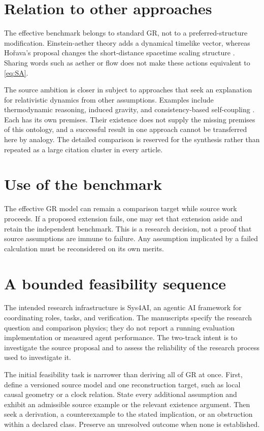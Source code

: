 \documentclass[11pt]{article}
\begin{document}
\section{Relation to other approaches}
The effective benchmark belongs to standard GR, not to a preferred-structure modification. Einstein-aether theory adds a dynamical timelike vector, whereas Ho\v{r}ava's proposal changes the short-distance spacetime scaling structure \parencite{JacobsonMattingly2001,Horava2009}. Sharing words such as aether or flow does not make these actions equivalent to \eqref{eq:SA}.

The source ambition is closer in subject to approaches that seek an explanation for relativistic dynamics from other assumptions. Examples include thermodynamic reasoning, induced gravity, and consistency-based self-coupling \parencite{Jacobson1995,Visser2002,Deser2004}. Each has its own premises. Their existence does not supply the missing premises of this ontology, and a successful result in one approach cannot be transferred here by analogy. The detailed comparison is reserved for the synthesis rather than repeated as a large citation cluster in every article.

\section{Use of the benchmark}
The effective GR model can remain a comparison target while source work proceeds. If a proposed extension fails, one may set that extension aside and retain the independent benchmark. This is a research decision, not a proof that source assumptions are immune to failure. Any assumption implicated by a failed calculation must be reconsidered on its own merits.

\section{A bounded feasibility sequence}
The intended research infrastructure is Sys4AI, an agentic AI framework for coordinating roles, tasks, and verification. The manuscripts specify the research question and comparison physics; they do not report a running evaluation implementation or measured agent performance. The two-track intent is to investigate the source proposal and to assess the reliability of the research process used to investigate it.

The initial feasibility task is narrower than deriving all of GR at once. First, define a versioned source model and one reconstruction target, such as local causal geometry or a clock relation. State every additional assumption and exhibit an admissible source example or the relevant existence argument. Then seek a derivation, a counterexample to the stated implication, or an obstruction within a declared class. Preserve an unresolved outcome when none is established.
\end{document}
